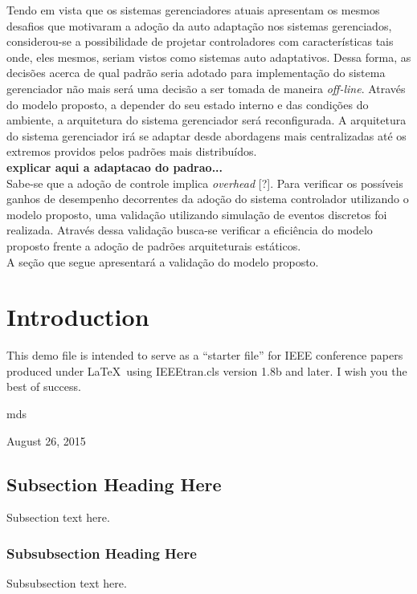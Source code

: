 \documentclass[conference]{IEEEtran}
\begin{document}
Tendo em vista que os sistemas gerenciadores atuais apresentam os mesmos desafios que motivaram a adoção da auto adaptação nos sistemas gerenciados, considerou-se a possibilidade de projetar controladores com características tais onde, eles mesmos, seriam vistos como sistemas auto adaptativos. Dessa forma, as decisões acerca de qual padrão seria adotado para implementação do sistema gerenciador não mais será uma decisão a ser tomada de maneira \textit{off-line}. Através do modelo proposto, a depender do seu estado interno e das condições do ambiente, a arquitetura do sistema gerenciador será reconfigurada. A arquitetura do sistema gerenciador irá se adaptar desde abordagens mais centralizadas até os extremos providos pelos padrões mais distribuídos.\\
\textbf{explicar aqui a adaptacao do padrao...}\\
Sabe-se que a adoção de controle implica \textit{overhead} [?]. Para verificar os possíveis ganhos de desempenho decorrentes da adoção do sistema controlador utilizando o modelo proposto, uma validação utilizando simulação de eventos discretos foi realizada. Através dessa validação busca-se verificar a eficiência do modelo proposto frente a adoção de padrões arquiteturais estáticos.\\
A seção que segue apresentará a validação do modelo proposto.














\section{Introduction}
This demo file is intended to serve as a ``starter file''
for IEEE conference papers produced under \LaTeX\ using
IEEEtran.cls version 1.8b and later.
I wish you the best of success.

\hfill mds
 
\hfill August 26, 2015

\subsection{Subsection Heading Here}
Subsection text here.


\subsubsection{Subsubsection Heading Here}
Subsubsection text here.
\end{document}
